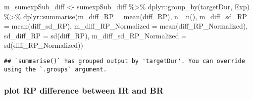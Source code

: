 \documentclass[
]{article}
\newenvironment{Shaded}{\begin{snugshade}}{\end{snugshade}}
\newcommand{\AttributeTok}[1]{\textcolor[rgb]{0.77,0.63,0.00}{#1}}
\newcommand{\FunctionTok}[1]{\textcolor[rgb]{0.00,0.00,0.00}{#1}}
\newcommand{\NormalTok}[1]{#1}
\newcommand{\OtherTok}[1]{\textcolor[rgb]{0.56,0.35,0.01}{#1}}
\newcommand{\SpecialCharTok}[1]{\textcolor[rgb]{0.00,0.00,0.00}{#1}}
\begin{document}
\begin{Shaded}
\begin{Highlighting}[]
\NormalTok{m\_sumexpSub\_diff }\OtherTok{\textless{}{-}}\NormalTok{ sumexpSub\_diff }\SpecialCharTok{\%\textgreater{}\%}\NormalTok{ dplyr}\SpecialCharTok{::}\FunctionTok{group\_by}\NormalTok{(targetDur, Exp) }\SpecialCharTok{\%\textgreater{}\%}
\NormalTok{    dplyr}\SpecialCharTok{::}\FunctionTok{summarise}\NormalTok{(}\AttributeTok{m\_diff\_RP =} \FunctionTok{mean}\NormalTok{(diff\_RP), }
                     \AttributeTok{n=} \FunctionTok{n}\NormalTok{(), }\AttributeTok{m\_diff\_sd\_RP =} \FunctionTok{mean}\NormalTok{(diff\_sd\_RP), }
                     \AttributeTok{m\_diff\_RP\_Normalized =} \FunctionTok{mean}\NormalTok{(diff\_RP\_Normalized), }
                     \AttributeTok{sd\_diff\_RP =} \FunctionTok{sd}\NormalTok{(diff\_RP), }\AttributeTok{m\_diff\_sd\_RP\_Normalized =} \FunctionTok{sd}\NormalTok{(diff\_RP\_Normalized))}
\end{Highlighting}
\end{Shaded}

\begin{verbatim}
## `summarise()` has grouped output by 'targetDur'. You can override using the `.groups` argument.
\end{verbatim}

\hypertarget{plot-rp-difference-between-ir-and-br}{%
\subsubsection{plot RP difference between IR and
BR}\label{plot-rp-difference-between-ir-and-br}}
\end{document}
